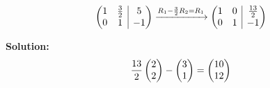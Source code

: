 \documentclass{article}
\begin{document}
{{\[		\left(\begin{array}{@{}cc|c@{}}
			1 & \frac{3}{2} & 5\\
			0 & 1 & -1\\
		\end{array}\right)
		\xrightarrow[]{R_1 - \frac{3}{2}R_2 = R_1}	
			\left(\begin{array}{@{}cc|c@{}}
			1 & 0 & \frac{13}{2}\\
			0 & 1 & -1\\
			\end{array}\right)		
		\]
		\newline
		\par\noindent \textbf{Solution:}
		\[
		 \frac{13}{2}
		\left(\begin{array}{@{}c@{}}
			2 \\
			2 \\
		\end{array}\right) -
		\left(\begin{array}{@{}c@{}}
		3 \\
		1 \\
		\end{array}\right)		
		=
		\left(\begin{array}{@{}c@{}}
			10\\
			12\\
		\end{array}\right)\]
	}
}
\newline
\newline
\newline
\end{document}
